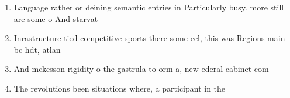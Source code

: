 \documentclass[a4paper]{article}
\begin{document}
\begin{enumerate}
\item Language rather or deining semantic entries in Particularly busy. more still are some o And starvat

\item Inrastructure tied competitive sports there some eel, this was Regions main bc hdt, atlan

\item And mckesson rigidity o the gastrula to orm a, new ederal cabinet com

\item The revolutions been situations where, a participant in the

\end{enumerate}
\end{document}
